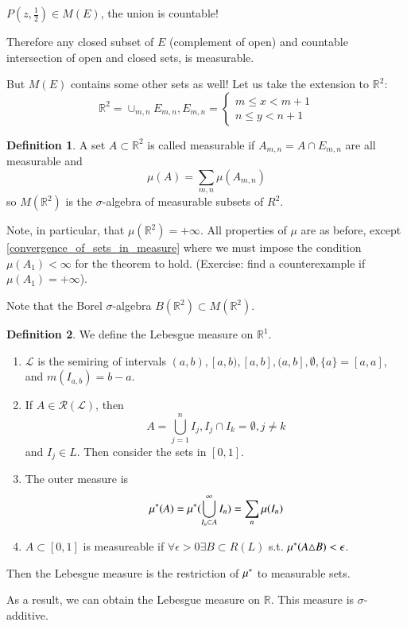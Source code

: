 \documentclass[11pt,a4paper]{report}
\theoremstyle{plain}
\theoremstyle{definition}
\newtheorem*{defn}{Definition}
\theoremstyle{remark}
\newcommand{\union}{\cup}
\newcommand{\intersection}{\cap}
\newcommand{\Union}{\bigcup}
\newcommand{\R}{\mathbb{R}}
\newcommand{\cL}{\mathcal{L}}
\newcommand{\cR}{\mathcal{R}}
\begin{document}
$P(z, \frac{1}{2}) \in M(E)$, the union is countable!

Therefore any closed subset of $E$ (complement of open) and countable intersection of open and closed sets, is measurable.

But $M(E)$ contains some other sets as well! Let us take the extension to $\R^2$:
$$ \R^2 = \union_{m, n} E_{m, n}, E_{m, n} = \begin{cases} 
    m \leq x < m + 1 \\
    n \leq y < n + 1 
  \end{cases} $$

\begin{defn}
  A set $A \subset \R^2$ is called measurable if $A_{m, n} = A \intersection E_{m,n}$ are all measurable and
  $$ \mu(A) = \sum_{m, n} \mu(A_{m, n}) $$
  so $M(\R^2)$ is the $\sigma$-algebra of measurable subsets of $R^2$.
\end{defn}

Note, in particular, that $\mu(\R^2) = +\infty$. All properties of $\mu$ are as before, except \ref{convergence_of_sets_in_measure} where we must impose the condition $\mu(A_1) < \infty$ for the theorem to hold. (Exercise: find a counterexample if $\mu(A_1) = +\infty$).

Note that the Borel $\sigma$-algebra $B(\R^2) \subset M(\R^2)$.

\begin{defn}
  We define the Lebesgue measure on $\R^1$.

  \begin{enumerate}
    \item $\cL$ is the semiring of intervals $(a, b), [a, b), [a, b], (a, b], \emptyset, \{ a \} = [a, a]$, and $m(I_{a,b}) = b -a$.
    \item If $A \in \cR(\cL)$, then $$ A = \Union_{j=1}^n I_j, I_j \intersection I_k = \emptyset, j \neq k $$ and $I_j \in L$. Then consider the sets in $[0, 1]$.
    \item The outer measure is $$ \mustar(A) = \mustar(\Union_{I_n \subset A}^\infty I_n) = \sum_{n} \mu(I_n) $$
    \item $A \subset [0, 1]$ is measureable if $\forall \epsilon > 0 \exists B \subset R(L)$ s.t. $\mu^{*} (A \triangle B) < \epsilon$.
  \end{enumerate}

  Then the Lebesgue measure is the restriction of $\mu^{*}$ to measurable sets.
\end{defn}

As a result, we can obtain the Lebesgue measure on $\R$. This measure is $\sigma$-additive.
\end{document}
